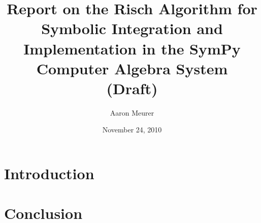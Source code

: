 \documentclass[12pt,titlepage]{article}
\begin{document}
\title{Report on the Risch Algorithm for Symbolic
Integration and Implementation in the Sym\-Py Computer Algebra System \\(Draft)}
\author{Aaron Meurer}
\date{November 24, 2010}
\maketitle
%
\begin{abstract}

\end{abstract}

\tableofcontents
\listoffigures
\listoftables

\section{Introduction}


\section{Conclusion}


\appendix

\printglossary

\nocite{*}


\end{document}
